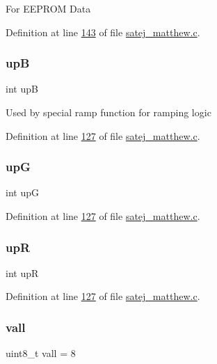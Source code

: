 For E\+E\+P\+R\+OM Data 

Definition at line \mbox{\hyperlink{satej__matthew_8c_source_l00143}{143}} of file \mbox{\hyperlink{satej__matthew_8c_source}{satej\+\_\+matthew.\+c}}.

\mbox{\label{satej__matthew_8c_a106fbf734fbb9c192880e1cd12f4a396}} 
\subsubsection{\texorpdfstring{upB}{upB}}
{\footnotesize\ttfamily int upB}

Used by special ramp function for ramping logic 

Definition at line \mbox{\hyperlink{satej__matthew_8c_source_l00127}{127}} of file \mbox{\hyperlink{satej__matthew_8c_source}{satej\+\_\+matthew.\+c}}.

\mbox{\label{satej__matthew_8c_a5fd7e7401aceed949131c42599336c36}} 
\subsubsection{\texorpdfstring{upG}{upG}}
{\footnotesize\ttfamily int upG}



Definition at line \mbox{\hyperlink{satej__matthew_8c_source_l00127}{127}} of file \mbox{\hyperlink{satej__matthew_8c_source}{satej\+\_\+matthew.\+c}}.

\mbox{\label{satej__matthew_8c_aa676cd48f328c4eb0b19b54828466beb}} 
\subsubsection{\texorpdfstring{upR}{upR}}
{\footnotesize\ttfamily int upR}



Definition at line \mbox{\hyperlink{satej__matthew_8c_source_l00127}{127}} of file \mbox{\hyperlink{satej__matthew_8c_source}{satej\+\_\+matthew.\+c}}.

\mbox{\label{satej__matthew_8c_a426799fe4a09815b45a213ed9f277065}} 
\subsubsection{\texorpdfstring{vall}{vall}}
{\footnotesize\ttfamily uint8\+\_\+t vall = 8}

